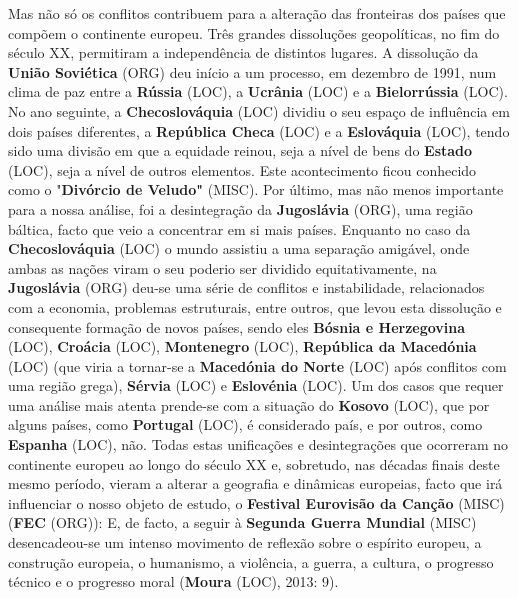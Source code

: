 \documentclass[12pt,a4paper]{article}
\begin{document}
Mas não só os conflitos contribuem para a alteração das fronteiras dos países que compõem o continente europeu. Três grandes dissoluções geopolíticas, no fim do século XX, permitiram a independência de distintos lugares. A dissolução da \textbf{União Soviética} (ORG) deu  início  a  um  processo,  em  dezembro  de  1991,  num  clima  de  paz  entre  a  \textbf{Rússia} (LOC),  a \textbf{Ucrânia} (LOC)  e  a  \textbf{Bielorrússia} (LOC).  No  ano  seguinte,  a  \textbf{Checoslováquia} (LOC)  dividiu  o  seu  espaço  de influência em dois países diferentes, a \textbf{República Checa} (LOC) e a \textbf{Eslováquia} (LOC), tendo sido uma divisão em que a equidade reinou, seja a nível de bens do \textbf{Estado} (LOC), seja a nível de outros elementos.  Este  acontecimento  ficou  conhecido  como  o  "\textbf{Divórcio  de  Veludo"} (MISC).  Por último, mas não menos importante para a nossa análise, foi a desintegração da \textbf{Jugoslávia} (ORG), uma região báltica, facto que veio a concentrar em si mais países. Enquanto no caso da \textbf{Checoslováquia} (LOC) o mundo assistiu a uma separação amigável, onde ambas as nações viram o seu poderio ser dividido equitativamente, na \textbf{Jugoslávia} (ORG) deu-se uma série de conflitos e instabilidade,  relacionados  com  a  economia,  problemas  estruturais,  entre  outros,  que levou  esta  dissolução  e  consequente  formação  de  novos  países,  sendo  eles  \textbf{Bósnia  e Herzegovina} (LOC),  \textbf{Croácia} (LOC),  \textbf{Montenegro} (LOC),  \textbf{República  da  Macedónia} (LOC)  (que  viria  a  tornar-se  a \textbf{Macedónia do Norte} (LOC) após conflitos com uma região grega), \textbf{Sérvia} (LOC) e \textbf{Eslovénia} (LOC). Um dos casos que requer uma análise mais atenta prende-se com a situação do \textbf{Kosovo} (LOC), que por alguns países, como \textbf{Portugal} (LOC), é considerado país, e por outros, como \textbf{Espanha} (LOC), não. Todas estas  unificações  e  desintegrações  que  ocorreram  no  continente  europeu  ao  longo  do século  XX  e,  sobretudo,  nas  décadas  finais  deste  mesmo  período,  vieram  a  alterar  a geografia  e  dinâmicas  europeias,  facto  que  irá  influenciar  o  nosso  objeto  de  estudo,  o \textbf{Festival Eurovisão da Canção} (MISC) (\textbf{FEC} (ORG)): E, de facto, a seguir à \textbf{Segunda Guerra Mundial} (MISC) desencadeou-se um intenso movimento de reflexão sobre o espírito europeu, a construção europeia, o humanismo, a violência, a guerra, a cultura, o progresso técnico e o progresso moral (\textbf{Moura} (LOC), 2013: 9).
\end{document}
